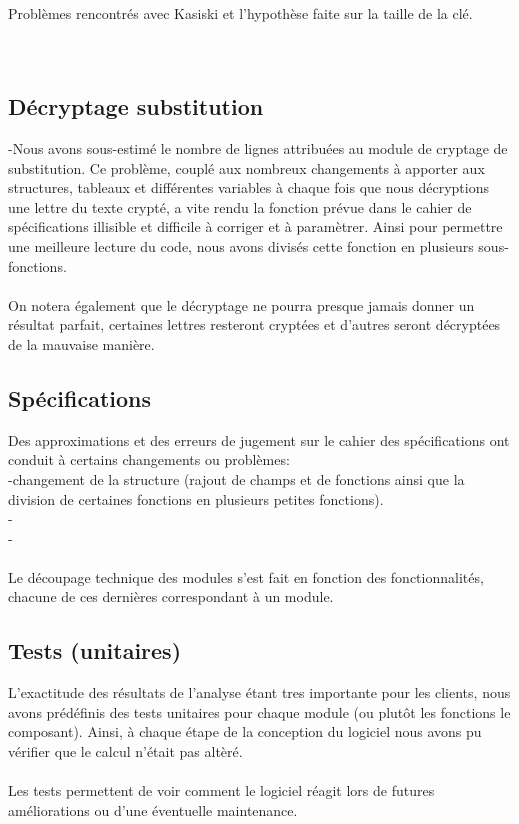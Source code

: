 \documentclass[a4]{article}
\begin{document}
 		Problèmes rencontrés avec Kasiski et l'hypothèse faite sur la taille de la clé. \\
  		 \\ \\
	
	\subsection{Décryptage substitution}
	 -Nous avons sous-estimé le nombre de lignes attribuées au module de cryptage de substitution.
	  Ce problème, couplé aux nombreux changements à apporter aux structures, tableaux et différentes
	  variables à chaque fois que nous décryptions une lettre du texte crypté, a vite rendu la fonction
	  prévue dans le cahier de spécifications illisible et difficile à corriger et à paramètrer. Ainsi 
	  pour permettre une meilleure lecture du code, nous avons divisés cette fonction en plusieurs sous-fonctions. \\ \\
    
    On notera également que le décryptage ne pourra presque jamais donner un résultat parfait, certaines lettres resteront 
    cryptées et d'autres seront décryptées de la mauvaise manière. 
		
		\subsection{Spécifications}
		Des approximations et des erreurs de jugement sur le cahier des spécifications ont conduit à certains changements ou problèmes:\\
		-changement de la structure (rajout de champs et de fonctions ainsi que la division de certaines fonctions en plusieurs
		 petites fonctions).\\
		
    -\\
		
    -\\ \\
		

		Le découpage technique des modules s'est fait en fonction des fonctionnalités, chacune de ces dernières correspondant 
    à un module.
		
		\subsection{Tests (unitaires)}
		L’exactitude des résultats de l'analyse étant tres importante pour les clients, nous avons prédéfinis des tests
unitaires pour chaque module (ou plutôt les fonctions le composant). Ainsi, à chaque étape de la conception du logiciel
nous avons pu vérifier que le calcul n’était pas altèré. \\ \\
Les tests permettent de voir comment le logiciel réagit lors de futures améliorations ou d'une éventuelle maintenance. \\ 
 
\end{document}
